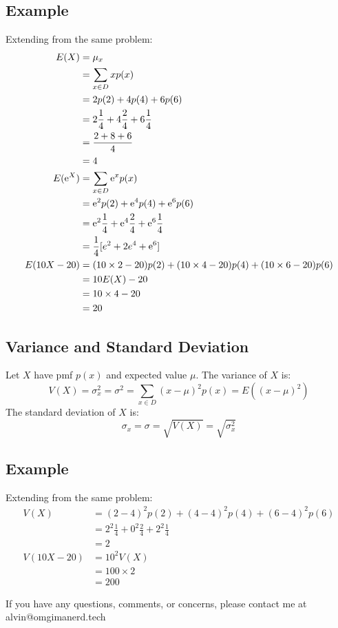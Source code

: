 \documentclass[letterpaper, 12pt]{math}
\begin{document}
\subsection*{Example}
Extending from the same problem:
\begin{align*}
  E(X) &= \mu_{x} \\
  &= \sum_{x\in D}xp(x) \\
  &= 2p(2)+4p(4)+6p(6) \\
  &= 2\frac{1}{4}+4\frac{2}{4}+6\frac{1}{4} \\
  &= \frac{2+8+6}{4} \\
  &= 4 \\
  E(\mathrm{e}^{X}) &= \sum_{x\in D}\mathrm{e}^{x}p(x) \\
  &= \mathrm{e}^{2}p(2)+\mathrm{e}^{4}p(4)+\mathrm{e}^{6}p(6) \\
  &= \mathrm{e}^{2}\frac{1}{4}+\mathrm{e}^{4}\frac{2}{4}+\mathrm{e}^{6}\frac{1}{4} \\
  &= \frac{1}{4}[e^{2}+2e^{4}+\mathrm{e}^{6}] \\
  E(10X-20) &= (10\times2-20)p(2)+(10\times4-20)p(4)+(10\times6-20)p(6) \\
  &= 10E(X)-20 \\
  &= 10\times4-20 \\
  &= 20
\end{align*}

\subsection*{Variance and Standard Deviation}
Let \( X \) have pmf \( p(x) \) and expected value \( \mu \). The variance of
\( X \) is:
\[ V(X) = \sigma_{x}^{2} = \sigma^{2} = \sum_{x\in D}(x-\mu)^{2}p(x) =
   E((x-\mu)^{2}) \]
The standard deviation of \( X \) is:
\[ \sigma_{x} = \sigma = \sqrt{V(X)} = \sqrt{\sigma_{x}^{2}} \]

\subsection*{Example}
Extending from the same problem:
\begin{align*}
  V(X) &= (2-4)^{2}p(2)+(4-4)^{2}p(4)+(6-4)^{2}p(6) \\
  &= 2^{2}\frac{1}{4}+0^{2}\frac{2}{4}+2^{2}\frac{1}{4} \\
  &= 2 \\
  V(10X-20) &= 10^{2}V(X) \\
  &= 100\times2 \\
  &= 200
\end{align*}

\begin{center}
  If you have any questions, comments, or concerns, please contact me at
  alvin@omgimanerd.tech
\end{center}
\end{document}
